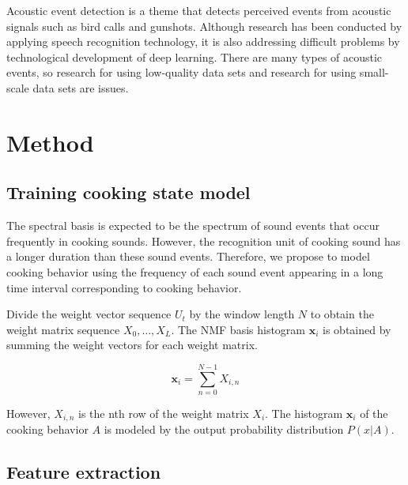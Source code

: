 \documentclass[sigchi]{acmart}
\begin{document}
Acoustic event detection is a theme that detects perceived events from acoustic signals such as bird calls and gunshots.
Although research has been conducted by applying speech recognition technology, it is also addressing difficult problems by technological development of deep learning.
There are many types of acoustic events, so research for using low-quality data sets and research for using small-scale data sets are issues\cite{Imoto2018}.

\section{Method}
\subsection{Training cooking state model}

The spectral basis is expected to be the spectrum of sound events that occur frequently in cooking sounds. However, the recognition unit of cooking sound has a longer duration than these sound events. Therefore, we propose to model cooking behavior using the frequency of each sound event appearing in a long time interval corresponding to cooking behavior.

Divide the weight vector sequence $ {U_t} $ by the window length $ N $ to obtain the weight matrix sequence $ X_0, \ldots, X_L $.
The NMF basis histogram $ \bm{x} _i $ is obtained by summing the weight vectors for each weight matrix.

\begin{equation}
\label{hist}
	\bm{x}_i = \sum_{n=0}^{N-1} X_{i, n}
\end{equation}

However, $ X_ {i, n} $ is the nth row of the weight matrix $ X_i $.
The histogram $ \bm {x} _i $ of the cooking behavior $ A $ is modeled by the output probability distribution $ P (x | A) $.

\subsection{Feature extraction}
\end{document}
